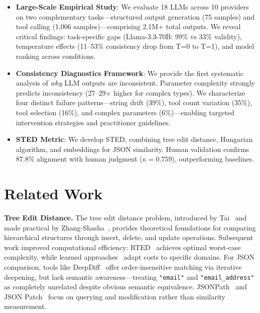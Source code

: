 \documentclass{article}
\theoremstyle{plain}
\theoremstyle{definition}
\begin{document}
\begin{itemize}[leftmargin=*, nosep]
\item \textbf{Large-Scale Empirical Study}: We evaluate 18 LLMs across 10 providers on two complementary tasks---structured output generation (75 samples) and tool calling (1,006 samples)---comprising 2.1M+ total outputs. We reveal critical findings: task-specific gaps (Llama-3.3-70B: 99\% vs 33\% validity), temperature effects (11--53\% consistency drop from T=0 to T=1), and model ranking across conditions.

\item \textbf{Consistency Diagnostics Framework}: We provide the first systematic analysis of \textit{why} LLM outputs are inconsistent. Parameter complexity strongly predicts inconsistency (27--29$\times$ higher for complex types). We characterize four distinct failure patterns---string drift (39\%), tool count variation (35\%), tool selection (16\%), and complex parameters (6\%)---enabling targeted intervention strategies and practitioner guidelines.

\item \textbf{STED Metric}: We develop STED, combining tree edit distance, Hungarian algorithm, and embeddings for JSON similarity. Human validation confirms 87.8\% alignment with human judgment ($\kappa=0.759$), outperforming baselines.
\end{itemize}

\section{Related Work}

\textbf{Tree Edit Distance.} The tree edit distance problem, introduced by Tai~\cite{Tai1979} and made practical by Zhang-Shasha~\cite{Zhang1989}, provides theoretical foundations for comparing hierarchical structures through insert, delete, and update operations. Subsequent work improved computational efficiency: RTED~\cite{Pawlik2011} achieves optimal worst-case complexity, while learned approaches~\cite{paassen2018tree,paassen2022revisiting} adapt costs to specific domains. For JSON comparison, tools like DeepDiff~\cite{seperman} offer order-insensitive matching via iterative deepening, but lack semantic awareness---treating \texttt{"email"} and \texttt{"email\_address"} as completely unrelated despite obvious semantic equivalence. JSONPath~\cite{Gessner2007} and JSON Patch~\cite{RFC6902} focus on querying and modification rather than similarity measurement.
\end{document}
